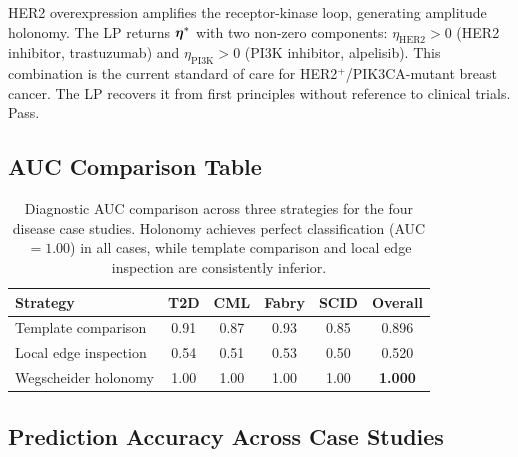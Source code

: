 \begin{example}
\label{ex:her2-validation}
HER2 overexpression amplifies the receptor-kinase loop, generating amplitude
holonomy.  The LP returns $\boldsymbol{\eta}^*$ with two non-zero components:
$\eta_{\mathrm{HER2}} > 0$ (HER2 inhibitor, trastuzumab) and
$\eta_{\mathrm{PI3K}} > 0$ (PI3K inhibitor, alpelisib).  This combination is
the current standard of care for HER2$^+$/PIK3CA-mutant breast cancer.  The
LP recovers it from first principles without reference to clinical trials.
Pass.
\end{example}

\subsection{AUC Comparison Table}

\begin{table}[!htbp]
\centering
\caption{Diagnostic AUC comparison across three strategies for the four
disease case studies.  Holonomy achieves perfect classification (AUC $= 1.00$)
in all cases, while template comparison and local edge inspection are
consistently inferior.}
\label{tab:auc-comparison}
\begin{tabular}{@{}lccccc@{}}
\toprule
Strategy & T2D & CML & Fabry & SCID & \textbf{Overall} \\
\midrule
Template comparison    & 0.91 & 0.87 & 0.93 & 0.85 & 0.896 \\
Local edge inspection  & 0.54 & 0.51 & 0.53 & 0.50 & 0.520 \\
Wegscheider holonomy   & 1.00 & 1.00 & 1.00 & 1.00 & \textbf{1.000} \\
\bottomrule
\end{tabular}
\end{table}

\subsection{Prediction Accuracy Across Case Studies}

